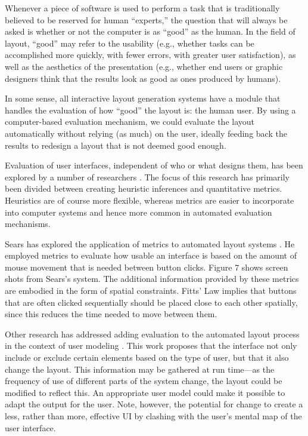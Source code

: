 		Whenever a piece of software is used to perform a task that is
		traditionally believed to be reserved for human “experts,” the question
		that will always be asked is whether or not the computer is as “good” as
		the human. In the field of layout, “good” may refer to the usability (e.g.,
		whether tasks can be accomplished more quickly, with fewer errors, with
		greater user satisfaction), as well as the aesthetics of the presentation
		(e.g., whether end users or graphic designers think that the results look
		as good as ones produced by humans).

		In some sense, all interactive layout generation systems have a module that
		handles the evaluation of how “good” the layout is: the human user. By
		using a computer-based evaluation mechanism, we could evaluate the layout
		automatically without relying (as much) on the user, ideally feeding back
		the results to redesign a layout that is not deemed good enough.

		Evaluation of user interfaces, independent of who or what designs them, has
		been explored by a number of researchers
		\citep{tullis-1,sears-1,sears-3,comver-1,jeffries-1}. The focus of this
		research has primarily been divided between creating heuristic inferences
		and quantitative metrics. Heuristics are of course more flexible, whereas
		metrics are easier to incorporate into computer systems and hence more
		common in automated evaluation mechanisms.

		Sears has explored the application of metrics to automated layout systems
		\citep{sears-2}. He employed metrics to evaluate how usable an interface is
		based on the amount of mouse movement that is needed between button clicks.
		Figure 7 shows screen shots from Sears’s system. The additional information
		provided by these metrics are embodied in the form of spatial constraints.
		Fitts’ Law \citep{mackenzie-1} implies that buttons that are often clicked
		sequentially should be placed close to each other spatially, since this
		reduces the time needed to move between them.

		Other research has addressed adding evaluation to the automated layout
		process in the context of user modeling \citep{schlungbaum-1}. This work
		proposes that the interface not only include or exclude certain elements
		based on the type of user, but that it also change the layout. This
		information may be gathered at run time—as the frequency of use of
		different parts of the system change, the layout could be modified to
		reflect this. An appropriate user model could make it possible to adapt the
		output for the user. Note, however, the potential for change to create a
		less, rather than more, effective UI by clashing with the user’s mental map
		of the user interface.

